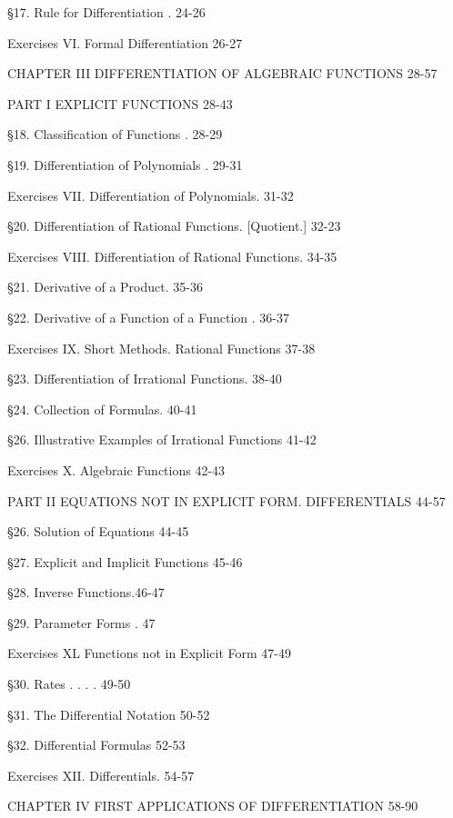 \documentclass[12pt]{article}
\begin{document}
\S 17. Rule for Differentiation . 24-26

Exercises VI. Formal Differentiation 26-27

CHAPTER III DIFFERENTIATION OF ALGEBRAIC FUNCTIONS  28-57

\begin{center}
PART I EXPLICIT FUNCTIONS 28-43
\end{center}

\S 18. Classification of Functions . 28-29

\S 19. Differentiation of Polynomials . 29-31

%

Exercises VII. Differentiation of Polynomials. 31-32

\S 20. Differentiation of Rational Functions. [Quotient.] 32-23

Exercises VIII. Differentiation of Rational Functions. 34-35

\S 21. Derivative of a Product. 35-36

\S 22. Derivative of a Function of a Function .  36-37

Exercises IX. Short Methods. Rational Functions 37-38

\S 23. Differentiation of Irrational Functions. 38-40

\S 24. Collection of Formulas. 40-41

\S 26. Illustrative Examples of Irrational Functions 41-42

Exercises X. Algebraic Functions 42-43

PART II EQUATIONS NOT IN EXPLICIT FORM. DIFFERENTIALS 44-57

\S 26. Solution of Equations 44-45

\S 27. Explicit and Implicit Functions 45-46

\S 28. Inverse Functions.46-47

\S 29. Parameter Forms . 47

Exercises XL Functions not in Explicit Form 47-49

\S 30. Rates . . . . 49-50

\S 31. The Differential Notation 50-52

\S 32. Differential Formulas 52-53

Exercises XII. Differentials. 54-57

CHAPTER IV FIRST APPLICATIONS OF DIFFERENTIATION 58-90
\end{document}
